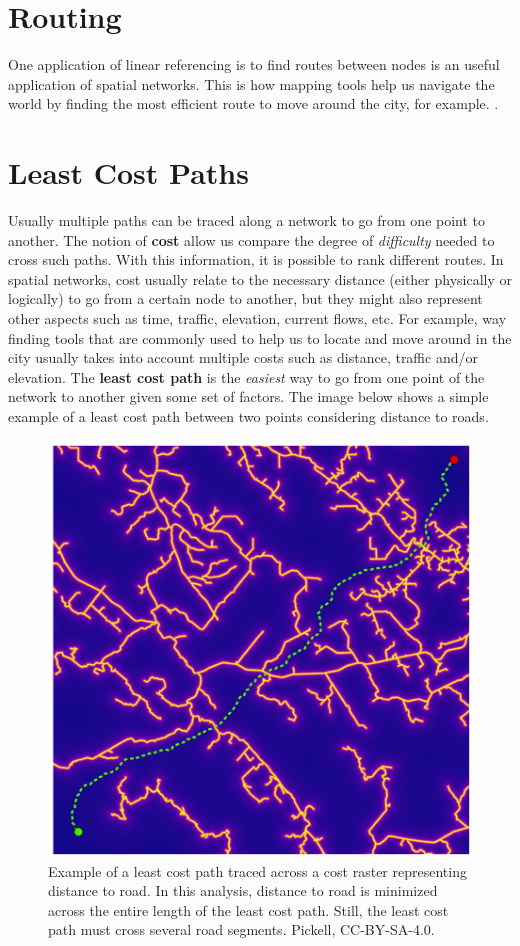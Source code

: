 \documentclass[
]{book}
\begin{document}
\section{Routing}\label{routing}

One application of linear referencing is to find routes between nodes is an useful application of spatial networks. This is how mapping tools help us navigate the world by finding the most efficient route to move around the city, for example. \citep{systems_innovation_network_2015}.

\section{Least Cost Paths}\label{least-cost-paths}

Usually multiple paths can be traced along a network to go from one point to another. The notion of \textbf{cost} allow us compare the degree of \emph{difficulty} needed to cross such paths. With this information, it is possible to rank different routes. In spatial networks, cost usually relate to the necessary distance (either physically or logically) to go from a certain node to another, but they might also represent other aspects such as time, traffic, elevation, current flows, etc. For example, way finding tools that are commonly used to help us to locate and move around in the city usually takes into account multiple costs such as distance, traffic and/or elevation. The \textbf{least cost path} is the \emph{easiest} way to go from one point of the network to another given some set of factors. The image below shows a simple example of a least cost path between two points considering distance to roads.

\begin{figure}
\includegraphics[width=0.75\linewidth]{images/08-least-cost-path} \caption{Example of a least cost path traced across a cost raster representing distance to road. In this analysis, distance to road is minimized across the entire length of the least cost path. Still, the least cost path must cross several road segments. Pickell, CC-BY-SA-4.0.}\label{fig:8-least-cost-path}
\end{figure}
\end{document}
